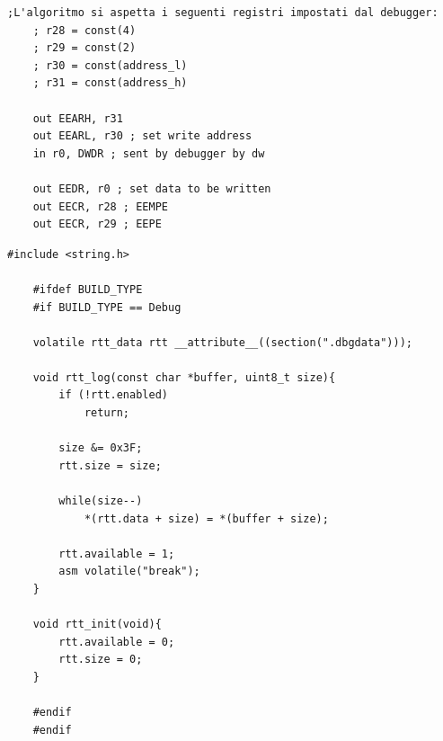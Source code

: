 \label{app:dw-eeprom-prog}

\begin{lstlisting}[language=AVR]
    ;L'algoritmo si aspetta i seguenti registri impostati dal debugger:
    ; r28 = const(4)
    ; r29 = const(2)
    ; r30 = const(address_l)
    ; r31 = const(address_h)

    out EEARH, r31
    out EEARL, r30 ; set write address
    in r0, DWDR ; sent by debugger by dw

    out EEDR, r0 ; set data to be written
    out EECR, r28 ; EEMPE
    out EECR, r29 ; EEPE
\end{lstlisting}

\label{app:rtt-lib}

\begin{lstlisting}[style=C]
    #include <string.h>

    #ifdef BUILD_TYPE
    #if BUILD_TYPE == Debug

    volatile rtt_data rtt __attribute__((section(".dbgdata")));

    void rtt_log(const char *buffer, uint8_t size){
        if (!rtt.enabled)
            return;
            
        size &= 0x3F;
        rtt.size = size;

        while(size--)
            *(rtt.data + size) = *(buffer + size);
            
        rtt.available = 1;
        asm volatile("break");
    }

    void rtt_init(void){
        rtt.available = 0;
        rtt.size = 0;
    }

    #endif
    #endif
\end{lstlisting}

